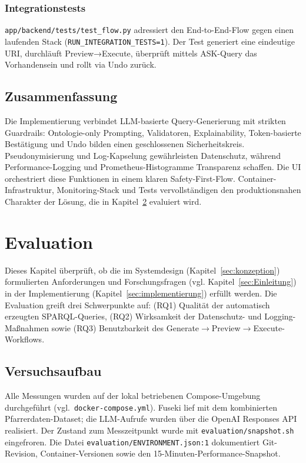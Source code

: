 \subsection{Integrationstests}
\texttt{app/backend/tests/test\_flow.py} adressiert den End-to-End-Flow gegen einen laufenden Stack (\texttt{RUN\_INTEGRATION\_TESTS=1}). Der Test generiert eine eindeutige URI, durchläuft Preview→Execute, überprüft mittels ASK-Query das Vorhandensein und rollt via Undo zurück.

\section{Zusammenfassung}
Die Implementierung verbindet LLM-basierte Query-Generierung mit strikten Guardrails: Ontologie-only Prompting, Validatoren, Explainability, Token-basierte Bestätigung und Undo bilden einen geschlossenen Sicherheitskreis. Pseudonymisierung und Log-Kapselung gewährleisten Datenschutz, während Performance-Logging und Prometheus-Histogramme Transparenz schaffen. Die UI orchestriert diese Funktionen in einem klaren Safety-First-Flow. Container-Infrastruktur, Monitoring-Stack und Tests vervollständigen den produktionsnahen Charakter der Lösung, die in Kapitel~\ref{sec:evaluation} evaluiert wird.






\chapter{Evaluation}
\label{sec:evaluation}

Dieses Kapitel überprüft, ob die im Systemdesign (Kapitel~\ref{sec:konzeption}) formulierten Anforderungen und Forschungsfragen (vgl. Kapitel~\ref{sec:Einleitung}) in der Implementierung (Kapitel~\ref{sec:implementierung}) erfüllt werden. Die Evaluation greift drei Schwerpunkte auf: (RQ1) Qualität der automatisch erzeugten SPARQL-Queries, (RQ2) Wirksamkeit der Datenschutz- und Logging-Maßnahmen sowie (RQ3) Benutzbarkeit des Generate$\rightarrow$Preview$\rightarrow$Execute-Workflows.

\section{Versuchsaufbau}

Alle Messungen wurden auf der lokal betriebenen Compose-Umgebung durchgeführt (vgl.\ \texttt{docker-compose.yml}). Fuseki lief mit dem kombinierten Pfarrerdaten-Dataset; die LLM-Aufrufe wurden über die OpenAI Responses API realisiert. Der Zustand zum Messzeitpunkt wurde mit \texttt{evaluation/snapshot.sh} eingefroren. Die Datei \texttt{evaluation/ENVIRONMENT.json:1} dokumentiert Git-Revision, Container-Versionen sowie den 15-Minuten-Performance-Snapshot.

